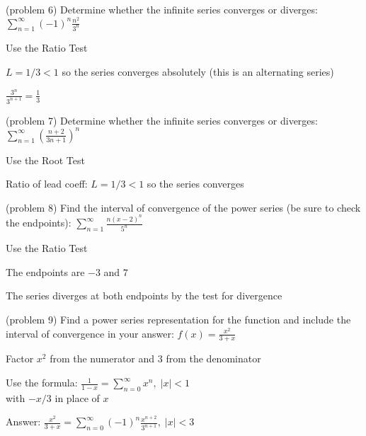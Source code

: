 \documentclass[handout]{ximera}
\begin{document}
\begin{problem}(problem 6)
Determine whether the infinite series converges or diverges: 
$\displaystyle \sum_{n=1}^\infty (-1)^n\frac{n^2}{3^n}$

\begin{hint}
Use the Ratio Test
\end{hint}

\begin{hint}
$L = 1/3 < 1$ so the series converges absolutely (this is an alternating series)
\end{hint}

\begin{hint}
$\frac{3^n}{3^{n+1}} = \frac13$
\end{hint}

\end{problem}


\begin{problem}(problem 7)
Determine whether the infinite series converges or diverges: 
$\displaystyle \sum_{n=1}^\infty \left(\frac{n+ 2}{3n+1}\right)^n$

\begin{hint}
Use the Root Test
\end{hint}

\begin{hint}
Ratio of lead coeff: $L = 1/3 < 1$ so the series converges
\end{hint}

\end{problem}

\begin{problem} (problem 8)
Find the interval of convergence of the power series (be sure to check the endpoints):
$\displaystyle \sum_{n=1}^\infty \frac{n(x-2)^n}{5^n}$

\begin{hint}
Use the Ratio Test
\end{hint}
\begin{hint}
The endpoints are $-3$ and $7$
\end{hint}
\begin{hint}
The series diverges at both endpoints by the test for divergence
\end{hint}

\end{problem}


\begin{problem} (problem 9)
Find a power series representation for the function and include the interval of convergence in your answer:
$\displaystyle f(x) = \frac{x^2}{3 + x}$

\begin{hint}
Factor $x^2$ from the numerator and $3$ from the denominator
\end{hint}
\begin{hint}
Use the formula: $\displaystyle \frac{1}{1-x} = \sum_{n = 0}^\infty x^n, \; |x| <1$\\
with $-x/3$ in place of $x$
\end{hint}
\begin{hint}
Answer: 
$\displaystyle \frac{x^2}{3 + x} = \sum_{n = 0}^\infty (-1)^n \frac{x^{n+2}}{3^{n+1}}, \; |x| <3$
\end{hint}
\end{problem}
\end{document}
